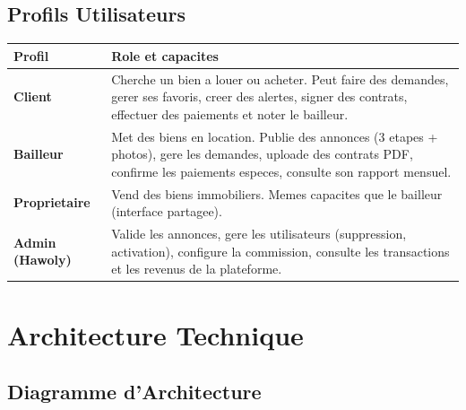\documentclass[12pt,a4paper]{article}
\begin{document}
\subsection{Profils Utilisateurs}

\begin{center}
\begin{tabular}{|p{3cm}|p{10cm}|}
\hline
\textbf{Profil} & \textbf{Role et capacites} \\
\hline
\textbf{Client} & Cherche un bien a louer ou acheter. Peut faire des demandes, gerer ses favoris, creer des alertes, signer des contrats, effectuer des paiements et noter le bailleur. \\
\hline
\textbf{Bailleur} & Met des biens en location. Publie des annonces (3 etapes + photos), gere les demandes, uploade des contrats PDF, confirme les paiements especes, consulte son rapport mensuel. \\
\hline
\textbf{Proprietaire} & Vend des biens immobiliers. Memes capacites que le bailleur (interface partagee). \\
\hline
\textbf{Admin (Hawoly)} & Valide les annonces, gere les utilisateurs (suppression, activation), configure la commission, consulte les transactions et les revenus de la plateforme. \\
\hline
\end{tabular}
\end{center}

\section{Architecture Technique}

\subsection{Diagramme d'Architecture}
\end{document}
